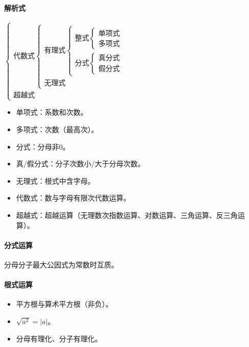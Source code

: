 \documentclass[
12pt, %
a4paper, 
oneside, %
headinclude,footinclude, %
]{scrartcl}
\begin{document}
\paragraph{解析式}
$
\begin{cases} 
  \text{代数式} \begin{cases} 
    \text{有理式} \begin{cases} 
      \text{整式} \begin{cases} 
        \text{单项式} \\ \text{多项式} \end{cases} \\ 
      \text{分式} \begin{cases} 
        \text{真分式} \\ \text{假分式} \end{cases} \end{cases} \\ 
    \text{无理式} \end{cases} \\ 
  \text{超越式} \end{cases}
$
\begin{itemize}
\item 单项式：系数和次数。
\item 多项式：次数（最高次）。
\item 分式：分母非$ 0 $。
\item 真/假分式：分子次数小/大于分母次数。
\item 无理式：根式中含字母。
\item 代数式：数与字母有限次代数运算。
\item 超越式：超越运算（无理数次指数运算、对数运算、三角运算、反三角运算）。
\end{itemize}
\paragraph{分式运算}
分母分子最大公因式为常数时互质。
\paragraph{根式运算}
\begin{itemize}
\item 平方根与算术平方根（非负）。
\item $ \sqrt{a^2} = |a| $。
\item 分母有理化、分子有理化。
\end{itemize}
\end{document}
